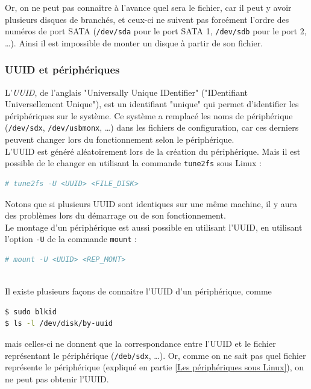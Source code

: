 Or, on ne peut pas connaitre à l'avance quel sera le fichier, car il peut y avoir plusieurs disques de branchés, et ceux-ci ne suivent pas forcément l'ordre des numéros de port SATA (\lstinline{/dev/sda} pour le port SATA 1, \lstinline{/dev/sdb} pour le port 2, \ldots).
Ainsi il est impossible de monter un disque à partir de son fichier.
\\




\subsubsection{UUID et périphériques}

L'\textit{UUID}, de l'anglais "Universally Unique IDentifier" ("IDentifiant Universellement Unique"), est un identifiant "unique" qui permet d'identifier les périphériques sur le système.
Ce système a remplacé les noms de périphérique (\lstinline{/dev/sdx}, \lstinline{/dev/usbmonx}, \ldots) dans les fichiers de configuration, car ces derniers peuvent changer lors du fonctionnement selon le périphérique.
\\


L'UUID est généré aléatoirement lors de la création du périphérique.
Mais il est possible de le changer en utilisant la commande \lstinline{tune2fs} sous Linux :
\begin{lstlisting}[language = sh]
# tune2fs -U <UUID> <FILE_DISK>
\end{lstlisting}

Notons que si plusieurs UUID sont identiques sur une même machine, il y aura des problèmes lors du démarrage ou de son fonctionnement.
\\


Le montage d'un périphérique est aussi possible en utilisant l'UUID, en utilisant l'option \lstinline{-U} de la commande \lstinline{mount} :
\begin{lstlisting}[language = sh]
# mount -U <UUID> <REP_MONT>
\end{lstlisting}
~~\\


Il existe plusieurs façons de connaitre l'UUID d'un périphérique, comme 
\begin{lstlisting}[language = sh]
$ sudo blkid
$ ls -l /dev/disk/by-uuid
\end{lstlisting}
mais celles-ci ne donnent que la correspondance entre l'UUID et le fichier représentant le périphérique (\lstinline{/deb/sdx}, \ldots).
Or, comme on ne sait pas quel fichier représente le périphérique (expliqué en partie \ref{Les périphériques sous Linux}), on ne peut pas obtenir l'UUID.


